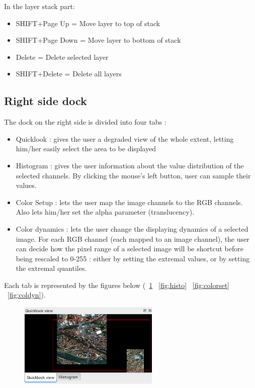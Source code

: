 In the layer stack part:
\begin{itemize}
\item SHIFT+Page Up = Move layer to top of stack
\item SHIFT+Page Down = Move layer to bottom of stack
\item Delete = Delete selected layer
\item SHIFT+Delete = Delete all layers
\end{itemize}


\subsection{Right side dock}
The dock on the right side is divided into four tabs : 
\begin{itemize}
\item Quicklook : gives the user a degraded view of the whole extent, letting him/her easily select the area to be displayed 
\item Histogram : gives the user information about the value distribution of the selected channels. By clicking the mouse's left button, user can sample their values.
\item Color Setup : lets the user map the image channels to the RGB channels. Also lets him/her set the alpha parameter (translucency).
\item Color dynamics : lets the user change the displaying dynamics of a selected image. For each RGB channel (each mapped to an image channel), the user can decide how the pixel range of a selected image will be shortcut before being rescaled to 0-255 : either by setting the extremal values, or by setting the extremal quantiles.
\end{itemize}

Each tab is represented by the figures below (~\ref{fig:quicklook} ~\ref{fig:histo} ~\ref{fig:colorset} ~\ref{fig:coldyn}).

\begin{figure}[!h] 
  \center
  \includegraphics[width=0.6\textwidth]{../Art/MonteverdiImages/quicklook.png}
  \label{fig:quicklook}
\end{figure}

